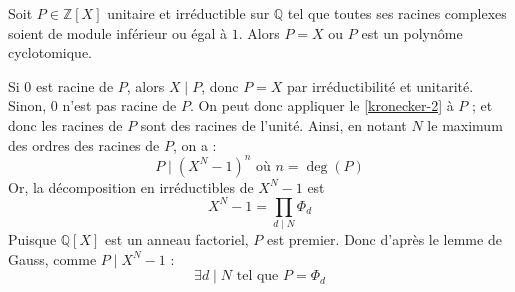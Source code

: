 	\begin{corollary}
		Soit $P \in \mathbb{Z}[X]$ unitaire et irréductible sur $\mathbb{Q}$ tel que toutes ses racines complexes soient de module inférieur ou égal à $1$. Alors $P = X$ ou $P$ est un polynôme cyclotomique.
	\end{corollary}

	\begin{demonstration}
		Si $0$ est racine de $P$, alors $X \mid P$, donc $P = X$ par irréductibilité et unitarité. Sinon, $0$ n'est pas racine de $P$. On peut donc appliquer le \cref{kronecker-2} à $P$ ; et donc les racines de $P$ sont des racines de l'unité. Ainsi, en notant $N$ le maximum des ordres des racines de $P$, on a :
		\[ P \mid (X^N - 1)^n \text{ où } n = \deg(P) \]
		Or, la décomposition en irréductibles de $X^N - 1$ est
		\[ X^N - 1 = \prod_{d \mid N} \Phi_d \]
		Puisque $\mathbb{Q}[X]$ est un anneau factoriel, $P$ est premier. Donc d'après le lemme de Gauss, comme $P \mid X^N - 1$ :
		\[ \exists d \mid N \text{ tel que } P = \Phi_d \]
	\end{demonstration}

